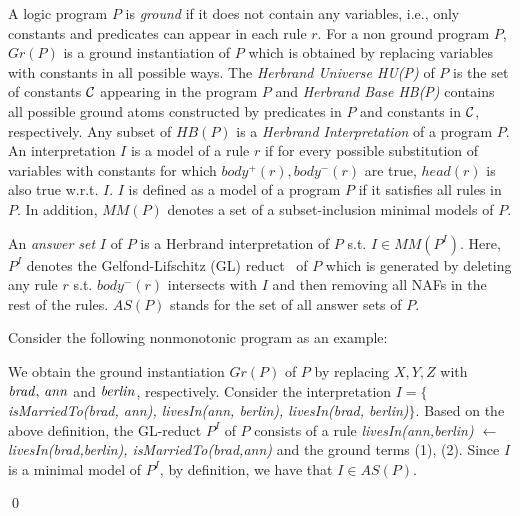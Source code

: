 A logic program $P$ is \textit{ground} if it does not contain any variables, i.e., only constants and predicates can appear in each rule $r$. For a non ground program $P$, $Gr(P)$ is a ground instantiation of $P$ which is obtained by replacing variables with constants in all possible ways. The \textit{Herbrand Universe HU(P)} of $P$ is the set of constants $\mathcal{C}$ appearing in the program $P$ and \textit{Herbrand Base HB(P)} contains all possible ground atoms constructed by predicates in $P$ and constants in $\mathcal{C}$, respectively. Any subset of $HB(P)$ is a \textit{Herbrand Interpretation} of a program $P$. An interpretation $I$ is a model of a rule $r$ if for every possible substitution of variables with constants for which $body^+(r), body^-(r)$ are true, $head(r)$ is also true w.r.t. $I$. $I$ is defined as a model of a program $P$ if it satisfies all rules in $P$. In addition, $MM(P)$ denotes a set of a subset-inclusion minimal models of $P$.

An \textit{answer set} $I$ of $P$ is a Herbrand interpretation of $P$ s.t. $I \in MM(P^I)$. Here, $P^I$ denotes the Gelfond-Lifschitz (GL) reduct~\cite{ref50} of $P$ which is generated by deleting any rule $r$ s.t. $body^-(r)$ intersects with $I$ and then removing all NAFs in the rest of the rules. $AS(P)$ stands for the set of all answer sets of $P$.

\begin{example}\label{ex:as}
Consider the following nonmonotonic program as an example:\\
{\small {}}

\normalsize
{\smallskip

\noindent            
We obtain the ground instantiation $Gr(P)$ of $P$ by replacing $X,Y,Z$ with $\mathit{brad, \,ann}$ and $\mathit{berlin}$, respectively. Consider the interpretation $I=\{${\small\textit{isMarriedTo(brad, ann), livesIn(ann, berlin), livesIn(brad, berlin)}}$\}$. Based on the above definition, the GL-reduct $P^I$ of $P$ consists of a rule \textit{livesIn(ann,berlin) $\leftarrow$ livesIn(brad,berlin), isMarriedTo(brad,ann)} and the ground terms (1), (2). Since $I$ is a minimal model of $P^I$, by definition, we have that $I \in AS(P)$.}\qed
\end{example}

